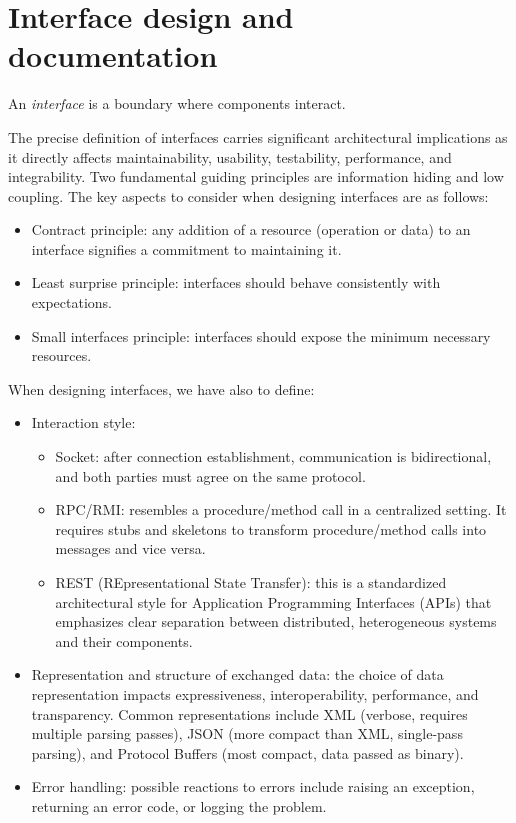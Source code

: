 \section{Interface design and documentation}

\begin{definition}
    An \emph{interface} is a boundary where components interact. 
\end{definition}
The precise definition of interfaces carries significant architectural implications as it directly affects maintainability, usability, testability, performance, and integrability. 
Two fundamental guiding principles are information hiding and low coupling.
The key aspects to consider when designing interfaces are as follows: 
\begin{itemize}
    \item Contract principle: any addition of a resource (operation or data) to an interface signifies a commitment to maintaining it.
    \item Least surprise principle: interfaces should behave consistently with expectations. 
    \item Small interfaces principle: interfaces should expose the minimum necessary resources.
\end{itemize}
When designing interfaces, we have also to define: 
\begin{itemize}
    \item Interaction style: 
        \begin{itemize}
            \item Socket: after connection establishment, communication is bidirectional, and both parties must agree on the same protocol.
            \item RPC/RMI: resembles a procedure/method call in a centralized setting. 
                It requires stubs and skeletons to transform procedure/method calls into messages and vice versa.
            \item REST (REpresentational State Transfer): this is a standardized architectural style for Application Programming Interfaces (APIs) that emphasizes clear separation between distributed, heterogeneous systems and their components.
        \end{itemize}
    \item Representation and structure of exchanged data: the choice of data representation impacts expressiveness, interoperability, performance, and transparency.
        Common representations include XML (verbose, requires multiple parsing passes), JSON (more compact than XML, single-pass parsing), and Protocol Buffers (most compact, data passed as binary).
    \item Error handling: possible reactions to errors include raising an exception, returning an error code, or logging the problem.
\end{itemize}
